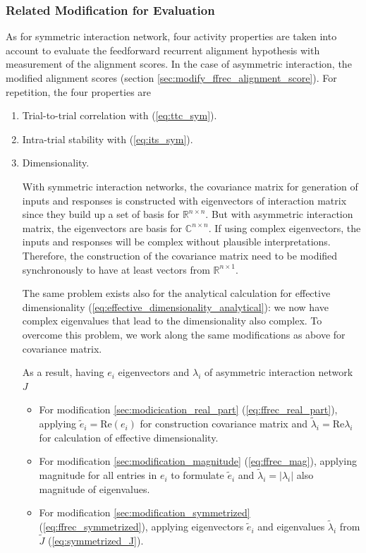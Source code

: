 \documentclass[11pt]{article}
\begin{document}
	\subsubsection{Related Modification for Evaluation} \label{sec:modification_asym}
	As for symmetric interaction network, four activity properties are taken into account to evaluate the feedforward recurrent alignment hypothesis with measurement of the alignment scores. In the case of asymmetric interaction, the modified alignment scores (section \ref{sec:modify_ffrec_alignment_score}). For repetition, the four properties are
		\begin{enumerate}
			\item Trial-to-trial correlation with (\ref{eq:ttc_sym}).
			\item Intra-trial stability with (\ref{eq:its_sym}).
			\item Dimensionality.%
			
				  With symmetric interaction networks, the covariance matrix for generation of inputs and responses is constructed with eigenvectors of interaction matrix since they build up a set of basis for $\mathbb{R}^{n \times n}$. But with asymmetric interaction matrix, the eigenvectors are basis for $\mathbb{C}^{n \times n}$. If using complex eigenvectors, the inputs and responses will be complex without plausible interpretations. Therefore, the construction of the covariance matrix need to be modified synchronously to have at least vectors from $\mathbb{R}^{n \times 1}$. 
				  
				  The same problem exists also for the analytical calculation for effective dimensionality (\ref{eq:effective_dimensionality_analytical}): we now have complex eigenvalues that lead to the dimensionality also complex. To overcome this problem, we work along the same modifications as above for covariance matrix.
				  
				  As a result, having $e_i$ eigenvectors and $\lambda_i$ of asymmetric interaction network $J$
				  \begin{itemize}
				  	\item For modification \ref{sec:modicication_real_part} (\ref{eq:ffrec_real_part}), applying $\tilde{e}_i = \text{Re}(e_i)$ for construction covariance matrix and $\tilde{\lambda}_i = \text{Re}\lambda_i$ for calculation of effective dimensionality. 
				  	\item For modification \ref{sec:modification_magnitude} (\ref{eq:ffrec_mag}), applying magnitude for all entries in $e_i$ to formulate $\tilde{e}_i$ and $\tilde{\lambda}_i = \vert \lambda_i \vert$ also magnitude of eigenvalues. 
				  	\item For modification \ref{sec:modification_symmetrized} (\ref{eq:ffrec_symmetrized}), applying eigenvectors $\tilde{e}_i$ and eigenvalues $\tilde{\lambda}_i$ from $\tilde{J}$ (\ref{eq:symmetrized_J}).
				  \end{itemize}
			  		

\end{enumerate}
\end{document}

